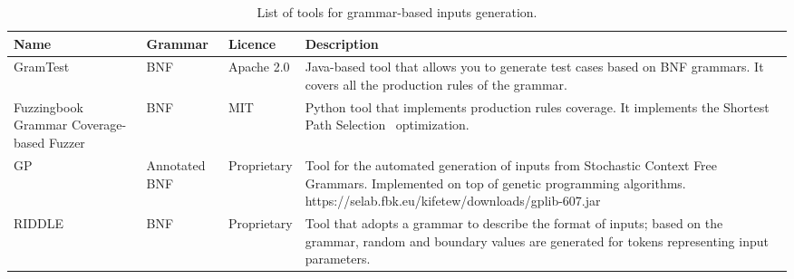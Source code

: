 \begin{table}[h]
\caption{List of tools for grammar-based inputs generation.}
\label{table:grammarGeneration}
\begin{center}
\tiny
\begin{tabular}{|p{2cm}|p{2cm}|p{2cm}|p{7cm}|}
\hline
\textbf{Name}&\textbf{Grammar}&\textbf{Licence}&\textbf{Description}\\
\hline
GramTest~\cite{GramTest}& BNF&Apache 2.0&Java-based tool that allows you to generate test cases based on BNF grammars. It covers all the production rules of the grammar.\\
\hline
Fuzzingbook Grammar Coverage-based Fuzzer~\cite{fuzzingbook2019:GrammarFuzzer}& BNF & MIT &Python tool that implements production rules coverage. It implements the Shortest Path Selection~\cite{Burkhardt:TestFromSyntax} optimization.\\
\hline
GP~\cite{GPlib,Kifetew:GBTest:2017}& Annotated BNF & Proprietary& Tool for the automated generation of inputs from Stochastic Context Free Grammars. Implemented on top of genetic programming algorithms. https://selab.fbk.eu/kifetew/downloads/gplib-607.jar\\
RIDDLE~\cite{ghosh1998testing}&BNF& Proprietary& Tool that adopts a grammar to describe the format of inputs; based on the grammar, random and boundary values are generated for tokens representing input parameters.\\
\hline
\end{tabular}
\end{center}
\end{table}%